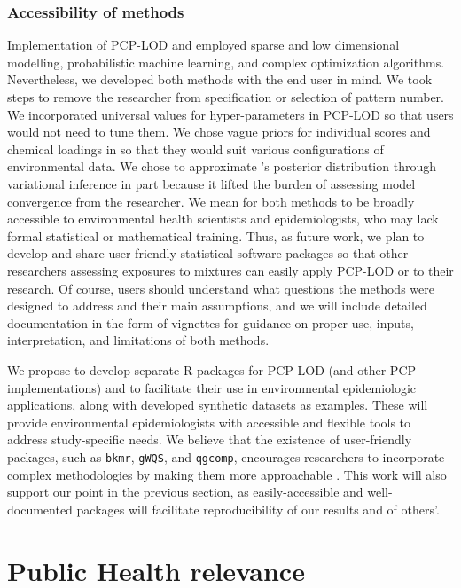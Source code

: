 \subsubsection{Accessibility of methods}\label{diss:access}
Implementation of PCP-LOD and \bnmf employed sparse and low dimensional modelling, probabilistic machine learning, and complex optimization algorithms. Nevertheless, we developed both methods with the end user in mind. We took steps to remove the researcher from specification or selection of pattern number. We incorporated universal values for hyper-parameters in PCP-LOD so that users would not need to tune them. We chose vague priors for individual scores and chemical loadings in \bnmf so that they would suit various configurations of environmental data. We chose to approximate \bnmfc's posterior distribution through variational inference in part because it lifted the burden of assessing model convergence from the researcher. We mean for both methods to be broadly accessible to environmental health scientists and epidemiologists, who may lack formal statistical or mathematical training. Thus, as future work, we plan to develop and share user-friendly statistical software packages so that other researchers assessing exposures to mixtures can easily apply PCP-LOD or \bnmf to their research. Of course, users should understand what questions the methods were designed to address and their main assumptions, and we will include detailed documentation in the form of vignettes for guidance on proper use, inputs, interpretation, and limitations of both methods.

We propose to develop separate R packages for PCP-LOD (and other PCP implementations) and \bnmf to facilitate their use in environmental epidemiologic applications, along with developed synthetic datasets as examples. These will provide environmental epidemiologists with accessible and flexible tools to address study-specific needs. We believe that the existence of user-friendly packages, such as \texttt{bkmr}, \texttt{gWQS}, and \texttt{qgcomp}, encourages researchers to incorporate complex methodologies by making them more approachable \cite{bobb2018statistical, renzetti2016gwqs, keil2020quantile}. This work will also support our point in the previous section, as easily-accessible and well-documented packages will facilitate reproducibility of our results and of others'.

\section{Public Health relevance}\label{sec:ph}
